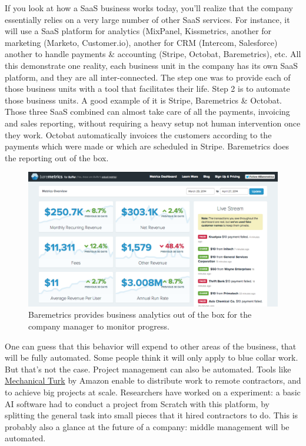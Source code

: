 \documentclass[12pt]{article}
\begin{document}
If you look at how a SaaS business works today, you'll realize that the company
essentially relies on a very large number of other SaaS services. For instance,
it will use a SaaS platform for analytics (MixPanel, Kissmetrics, another for
marketing (Marketo, Customer.io), another for CRM (Intercom, Salesforce) another
to handle payments \& accounting (Stripe, Octobat, Baremetrics), etc.
All this demonstrate one reality, each business unit in the company has its own
SaaS platform, and they are all inter-connected. The step one was to provide
each of those business units with a tool that facilitates their life. Step 2 is
to automate those business units. A good example of it is Stripe, Baremetrics
\& Octobat. Those three SaaS combined can almost take care of all the payments,
invoicing and sales reporting, without requiring a heavy setup not human
intervention once they work. Octobat automatically invoices the customers
according to the payments which were made or which are scheduled in Stripe.
Baremetrics does the reporting out of the box.

\begin{figure}[ht]
    \centering
    \includegraphics[width=\textwidth]{baremetrics}
    \caption{Baremetrics provides business analytics out of the box for the
    company manager to monitor progress.}
    \label{fig:baremetrics}
\end{figure}

\smallskip

One can guess that this behavior will expend to other areas of the business,
that will be fully automated. Some people think it will only apply to blue
collar work. But that's not the case. Project management can also be automated.
Tools like \href{https://www.mturk.com/mturk/welcome}{Mechanical Turk} by Amazon
enable to distribute work to remote contractors, and to achieve big projects at
scale. Researchers have worked on a experiment: a basic AI software had to
conduct a project from Scratch with this platform, by splitting the general
task into small pieces that it hired contractors to do. This is probably also a
glance at the future of a company: middle management will be automated.
\end{document}
